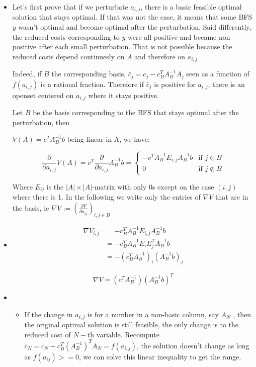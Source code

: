 \documentclass[12pt]{article}
\begin{document}
\begin{itemize}

\item
Let's first prove that if we perturbate $a_{i,j}$, there is a basic feasible optimal solution that stays optimal. If that was not the case, it means that some BFS $y$ wasn't optimal and become optimal after the perturbation. Said differently, the reduced costs corresponding to $y$ were all positive and became non positive after each small perturbation. That is not possible because the reduced costs depend continuesly on $A$ and therefore on $a_{i,j}$

Indeed, if $B$ the corresponding basis, $\bar c_j = c_j - c_B^T A_B^{-1} A_j$ seen as a function of $f(a_{i,j})$ is a rational fraction. Therefore if $\bar c_j$ is positive for $a_{i,j}$, there is an openset centered on $a_{i,j}$ where it stays positive.


Let $B$ be the basis corresponding to the BFS that stays optimal after the perturbation, then

$V(A) = c^T A_B^{-1} b$ being linear in A, we have: 

\[ \frac{\partial}{\partial a_{i,j}} V(A) = c^T\frac{\partial}{\partial a_{i,j}} A_B^{-1} b 
= \left\{ \begin{array}{cc}
-c^T A_B^{-1} E_{i,j} A_B^{-1}b & \text{if $j \in B$}\\
0 & \text{if $j \not \in B$}
\end{array}
\right.
\]

Where $E_{ij}$ is the $|A| \times |A|$-matrix with only 0s except on the case $(i,j)$ where there is 1.
In the following we write only the entries of $\nabla V$ that are in the basis, ie $\nabla V := (\frac{\partial V}{\partial a_{ij}})_{i, j \in B}$
\item 

\begin{align}
\nabla V_{i,j} &= -c_B^T A_B^{-1} E_{i,j} A_B^{-1}b \\
&=- c_B^T A_B^{-1} E_i E_j^T A_B^{-1}b \\
&=- (c_B^T A_B^{-1})_i (A_B^{-1}b)_j
\end{align}


$$\nabla V = (c^T A_B^{-1})(A_B^{-1} b)^T$$

\item

\begin{itemize}

\item
If the change in $a_{i,j}$ is for a number in a non-basic column, say $A_N$ , then the original optimal solution is still feasible, the only change is to the reduced cost of $N-$th variable. 
Recompute $\bar c_N = c_N - c_B^T(A_B^{-1})^TA_N = f(a_{i,j})$, the solution doesn't change as long as  $f(a_{ij}) >= 0$, we can solve this linear inequality to get the range.


\end{itemize}
\end{itemize}
\end{document}
